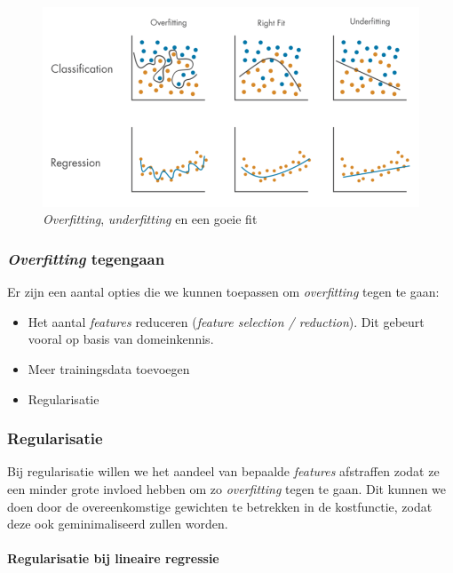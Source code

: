 \begin{figure}[h]
	\centering
	\includegraphics[width=\textwidth]{images/11-overfitting-underfitting.png}
	\caption{\textit{Overfitting}, \textit{underfitting} en een goeie fit}
	\label{fig:overfitting-underfitting}
\end{figure}

\subsubsection{\textit{Overfitting} tegengaan}

Er zijn een aantal opties die we kunnen toepassen om \textit{overfitting} tegen te gaan:
\begin{itemize}
	\item Het aantal \textit{features} reduceren (\textit{feature selection / reduction}). Dit gebeurt vooral op basis van domeinkennis.
	\item Meer trainingsdata toevoegen
	\item Regularisatie
\end{itemize}

\subsubsection{Regularisatie}

Bij regularisatie willen we het aandeel van bepaalde \textit{features} afstraffen zodat ze een minder grote invloed hebben om zo \textit{overfitting} tegen te gaan. Dit kunnen we doen door de overeenkomstige gewichten te betrekken in de kostfunctie, zodat deze ook geminimaliseerd zullen worden. 

\paragraph{Regularisatie bij lineaire regressie}

